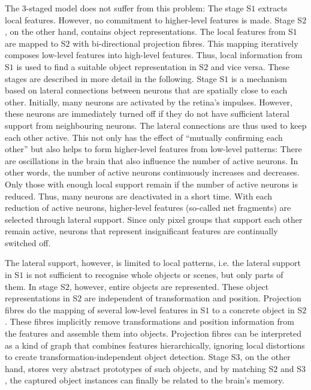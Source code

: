 The $3$-staged model does not suffer from this problem: The stage S$1$ extracts local features. However, no commitment to higher-level features is made. Stage S$2$, on the other hand, contains object representations. The local features from S$1$ are mapped to S$2$ with bi-directional projection fibres. This mapping iteratively composes low-level features into high-level features. Thus, local information from S$1$ is used to find a suitable object representation in S$2$ and vice versa. These stages are described in more detail in the following.
Stage S$1$ is a mechanism based on lateral connections between neurons that are spatially close to each other. Initially, many neurons are activated by the retina's impulses. However, these neurons are immediately turned off if they do not have sufficient lateral support from neighbouring neurons. The lateral connections are thus used to keep each other active. This not only has the effect of ``mutually confirming each other'' but also helps to form higher-level features from low-level patterns: There are oscillations in the brain that also influence the number of active neurons. In other words, the number of active neurons continuously increases and decreases. Only those with enough local support remain if the number of active neurons is reduced. Thus, many neurons are deactivated in a short time. With each reduction of active neurons, higher-level features (so-called net fragments) are selected through lateral support.
Since only pixel groups that support each other remain active, neurons that represent insignificant features are continually switched off.

The lateral support, however, is limited to local patterns, i.e. the lateral support in S$1$ is not sufficient to recognise whole objects or scenes, but only parts of them. In stage S$2$, however, entire objects are represented. These object representations in S$2$ are independent of transformation and position. Projection fibres do the mapping of several low-level features in S$1$ to a concrete object in S$2$. These fibres implicitly remove transformations and position information from the features and assemble them into objects. Projection fibres can be interpreted as a kind of graph that combines features hierarchically, ignoring local distortions to create transformation-independent object detection. Stage S$3$, on the other hand, stores very abstract prototypes of such objects, and by matching S$2$ and S$3$, the captured object instances can finally be related to the brain's memory.

